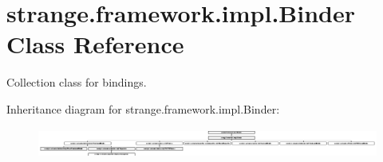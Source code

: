 \hypertarget{classstrange_1_1framework_1_1impl_1_1_binder}{\section{strange.\-framework.\-impl.\-Binder Class Reference}
\label{classstrange_1_1framework_1_1impl_1_1_binder}
}


Collection class for bindings.  


Inheritance diagram for strange.\-framework.\-impl.\-Binder\-:\begin{figure}[H]
\begin{center}
\leavevmode
\includegraphics[height=0.987654cm]{classstrange_1_1framework_1_1impl_1_1_binder}
\end{center}
\end{figure}

